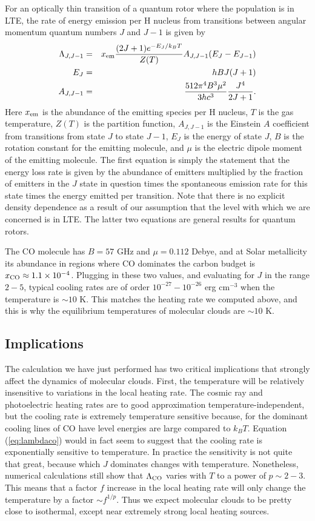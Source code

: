 For an optically thin transition of a quantum rotor where the population is in LTE, the rate of energy emission per H nucleus from transitions between angular momentum quantum numbers $J$ and $J-1$ is given by
\begin{eqnarray}
\label{eq:lambdaco}
\Lambda_{J,J-1} & = & x_{\rm em} \frac{(2J+1)e^{-E_J/k_B T}}{Z(T)} A_{J,J-1} (E_J - E_{J-1}) \\
E_J & = & h B J (J+1) \\
A_{J,J-1} & = & \frac{512\pi^4 B^3\mu^2}{3hc^3} \frac{J^4}{2J+1}.
\end{eqnarray}
Here $x_{\rm em}$ is the abundance of the emitting species per H nucleus, $T$ is the gas temperature, $Z(T)$ is the partition function, $A_{J,J-1}$ is the Einstein $A$ coefficient from transitions from state $J$ to state $J-1$, $E_J$ is the energy of state $J$, $B$ is the rotation constant for the emitting molecule, and $\mu$ is the electric dipole moment of the emitting molecule. The first equation is simply the statement that the energy loss rate is given by the abundance of emitters multiplied by the fraction of emitters in the $J$ state in question times the spontaneous emission rate for this state times the energy emitted per transition. Note that there is no explicit density dependence as a result of our assumption that the level with which we are concerned is in LTE. The latter two equations are general results for quantum rotors.

The CO molecule has $B=57$ GHz and $\mu=0.112$ Debye, and at Solar metallicity its abundance in regions where CO dominates the carbon budget is $x_{\rm CO} \approx 1.1\times 10^{-4}$. Plugging in these two values, and evaluating for $J$ in the range $2-5$, typical cooling rates are of order $10^{-27}-10^{-26}$ erg cm$^{-3}$ when the temperature is $\sim 10$ K. This matches the heating rate we computed above, and this is why the equilibrium temperatures of molecular clouds are $\sim 10$ K.

\subsection{Implications}

The calculation we have just performed has two critical implications that strongly affect the dynamics of molecular clouds. First, the temperature will be relatively insensitive to variations in the local heating rate. The cosmic ray and photoelectric heating rates are to good approximation temperature-independent, but the cooling rate is extremely temperature sensitive because, for the dominant cooling lines of CO have level energies are large compared to $k_B T$. Equation (\ref{eq:lambdaco}) would in fact seem to suggest that the cooling rate is exponentially sensitive to temperature. In practice the sensitivity is not quite that great, because which $J$ dominates changes with temperature. Nonetheless, numerical calculations still show that $\Lambda_{\rm CO}$ varies with $T$ to a power of $p \sim 2-3$. This means that a factor $f$ increase in the local heating rate will only change the temperature by a factor $\sim f^{1/p}$. Thus we expect molecular clouds to be pretty close to isothermal, except near extremely strong local heating sources.

